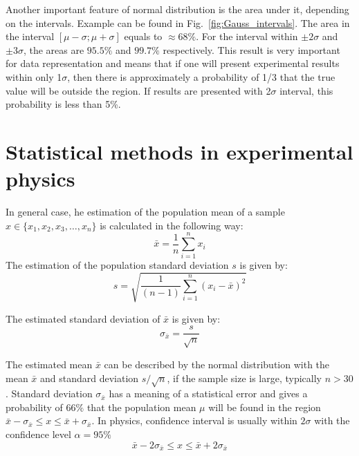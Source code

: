 \documentclass[12pt,a4paper]{report}
\begin{document}
Another important feature of normal distribution is the area under it, depending on the intervals. Example can be found in Fig.~\ref{fig:Gauss_intervals}. The area in the interval $[\mu-\sigma;\mu+\sigma]$ equals to $\approx 68\%$. For the interval within $\pm 2\sigma$ and $\pm 3\sigma$, the areas are $95.5\%$ and $99.7\%$ respectively. This result is very important for data representation and means that if one will present experimental results within only 1$\sigma$, then there is approximately a probability of 1/3 that the true value will be outside the region. If results are presented with 2$\sigma$ interval, this probability is less than 5\%.



\section{Statistical methods in experimental physics} \label{methods}

In general case, he estimation of the population mean of a sample $x \in \{ x_1, x_2, x_3, \dots , x_n \}$ is calculated in the following way:
\begin{equation} \label{av_value}
\bar{x} = \frac{1}{n} \sum_{i = 1}^{n} {x_i}
\end{equation}
The estimation of the population standard deviation $s$ is given by:
\begin{equation} \label{sample_standard_dev}
s = \sqrt{\frac{1}{(n-1)} \sum_{i = 1}^{n} {(x_i - \bar{x})^2}}
\end{equation}

The estimated standard deviation of $\bar{x}$ is given by:
\begin{equation} \label{standart_dev}
\sigma_{\bar{x}} = \frac{s}{ \sqrt{n} }
\end{equation}

The estimated mean $\bar{x}$ can be described by the normal distribution with the mean $\bar{x}$ and standard deviation $s / \sqrt{n}$, if the sample size is large, typically $n>30$.
Standard deviation $\sigma_{\bar{x}}$ has a meaning of a statistical error and gives a probability of 66$\%$ that the population mean $\mu$ will be found in the region $\bar{x} - \sigma_{\bar{x}} \le x \le \bar{x} + \sigma_{\bar{x}}$. In physics, confidence interval is usually within $2 \sigma$ with the confidence level $\alpha = 95 \%$
\begin{equation} \label{confidence_interval_large}
\bar{x} - 2 \sigma_{\bar{x}} \le x \le \bar{x} + 2 \sigma_{\bar{x}}
\end{equation}
\end{document}
